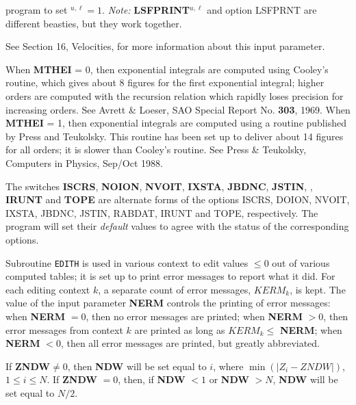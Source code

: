 program to set $^{u,\ell} = 1$. \np
{\it Note:} {\bf LSFPRINT}$^{u,\ell}$ and option LSFPRNT are different
beasties, but they work together.
\blankline
\blankline
\centerline{}
\space \noindent
See Section 16, Velocities, for more information about this input parameter.
\blankline
\blankline
\centerline{}
\space \noindent
When {\bf MTHEI} = 0, then exponential integrals are computed using Cooley's
routine, which gives about 8 figures for the first exponential integral;
higher orders are computed with the recursion relation which rapidly loses
precision for increasing orders. See Avrett \& Loeser, SAO Special Report
No. {\bf 303}, 1969. \np
When {\bf MTHEI} = 1, then exponential integrals are computed using a routine
published by Press and Teukolsky. This routine has been set up to deliver
about 14 figures for all orders; it is slower than Cooley's routine.
See Press \& Teukolsky, Computers in Physics, Sep/Oct 1988.
\ej
\centerline{}
\space \noindent
The switches {\bf ISCRS}, {\bf NOION}, {\bf NVOIT}, {\bf IXSTA},
{\bf JBDNC}, {\bf JSTIN}, , {\bf IRUNT} and {\bf TOPE}
are alternate forms of the options \break ISCRS, DOION, NVOIT, IXSTA,
JBDNC, JSTIN, RABDAT, IRUNT \break and TOPE, respectively. The
program will set their {\it default} values to agree with the status
of the corresponding options.
\blankline
\blankline
\centerline{}
\space \noindent
Subroutine {\tt EDITH} is used in various context to edit values $\le 0$
out of various computed tables; it is set up to print error messages to
report what it did. For each editing context $k$, a separate count of
error messages, $KERM_k$, is kept. The value of the input parameter
{\bf NERM} controls the printing of error messages: \np
when {\bf NERM} $= 0$, then no error messages are printed; \np
when {\bf NERM} $> 0$, then error messages from context $k$ are printed as
long as $KERM_k \le$ {\bf NERM}; \np
when {\bf NERM} $< 0$, then all error messages are printed, but greatly
abbreviated.
\blankline
\blankline
\centerline{}
\space \noindent
If {\bf ZNDW}$ \neq 0$, then {\bf NDW} will be set equal to $i$, where
$\min(|Z_i - ZNDW|)$, \break $ 1 \leq i \leq N$. If {\bf ZNDW} $=0$, then,
if {\bf NDW} $<1$ or {\bf NDW} $> N$, {\bf NDW} will be set
equal to $N/2$.
\blankline
\blankline
\centerline{}
